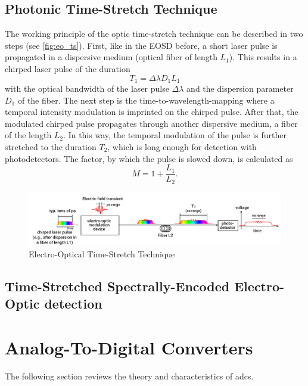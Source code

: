 \subsection{Photonic Time-Stretch Technique}
The working principle of the optic time-stretch technique can be described in two steps (see \autoref{fig:eo_ts}). First, like in the EOSD before, a short laser pulse is propagated in a dispersive medium (optical fiber of length $L_1$). This results in a chirped laser pulse of the duration
\begin{equation}
	T_1 = \Delta \lambda D_1 L_1
\end{equation}
with the optical bandwidth of the laser pulse $\Delta \lambda$  and the dispersion parameter $D_1$ of the fiber.  The next step is the time-to-wavelength-mapping where a temporal intensity modulation is imprinted on the chirped pulse. After that, the modulated chirped pulse propagates through another dispersive medium, a fiber of the length $L_2$. In this way, the temporal modulation of the pulse is further stretched to the duration $T_2$, which is long enough for detection with photodetectors. \cite{roussel2014}
The factor, by which the pulse is slowed down, is calculated as
\begin{equation}
	M = 1 + \frac{L_1}{L_2}.
\end{equation}

\begin{figure}[H]
	\centering
	\includegraphics[width = \textwidth]{chap/02-theory/img/time_stretch.png}
	\caption{Electro-Optical Time-Stretch Technique \cite{szwaj}}
	\label{fig:eo_ts}
\end{figure}

\subsection{Time-Stretched Spectrally-Encoded Electro-Optic detection}





\newpage
\section{Analog-To-Digital Converters}
The following section reviews the theory and characteristics of \glspl{adc}.

